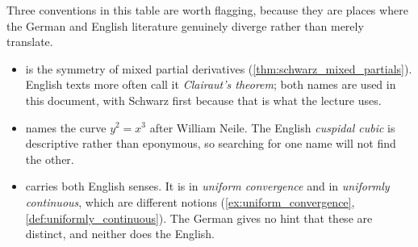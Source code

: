 \begin{ainote}
Three conventions in this table are worth flagging, because they are places where the German
and English literature genuinely diverge rather than merely translate.
\begin{itemize}
  \item \textbf{} is the symmetry of mixed partial derivatives
    (\cref{thm:schwarz_mixed_partials}). English texts more often call it \emph{Clairaut's
    theorem}; both names are used in this document, with Schwarz first because that is what the
    lecture uses.
  \item \textbf{} names the curve $y^2 = x^3$ after William Neile.
    The English \emph{cuspidal cubic} is descriptive rather than eponymous, so searching for one
    name will not find the other.
  \item \textbf{} carries both English senses. It is
     in \emph{uniform convergence} and in \emph{uniformly continuous}, which are
    different notions (\cref{ex:uniform_convergence}, \cref{def:uniformly_continuous}). The
    German gives no hint that these are distinct, and neither does the English.
\end{itemize}
\end{ainote}
